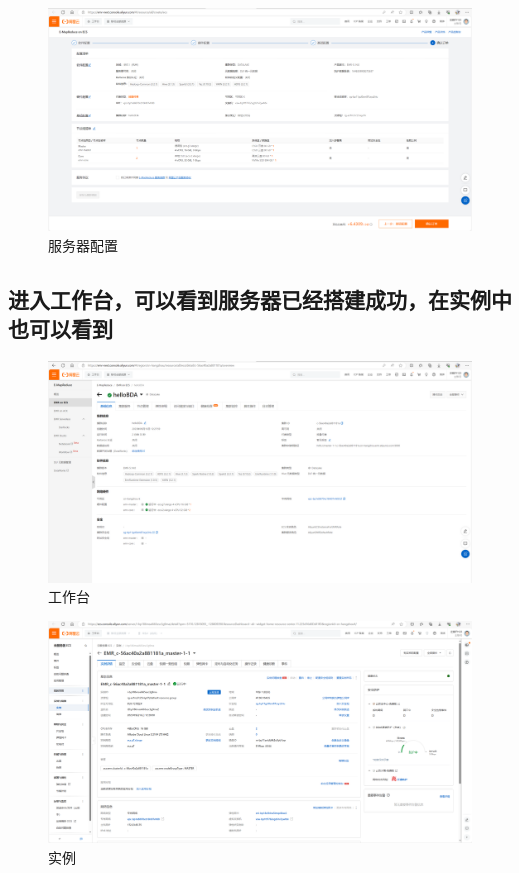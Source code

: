 \begin{figure}[H]
  \centering
  \includegraphics[width=\textwidth]{figure/setting4.png}
  \caption{服务器配置}
  \label{fig:my_label}
\end{figure}

\subsection{进入工作台，可以看到服务器已经搭建成功，在实例中也可以看到}
\begin{figure}[H]
  \centering
  \includegraphics[width=\textwidth]{figure/controller1.png}
  \caption{工作台}
  \label{fig:my_label}
\end{figure}
\begin{figure}[H]
  \centering
  \includegraphics[width=\textwidth]{figure/controller2.png}
  \caption{实例}
  \label{fig:my_label}
\end{figure}


